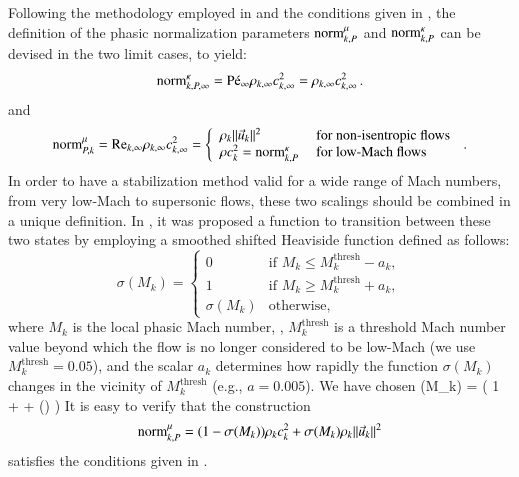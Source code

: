 \documentclass[preprint,10pt]{elsarticle}
\begin{document}
 
Following the methodology employed in \cite{DelchiniCompFluid2014-euler} and the conditions given in , the definition of the 
phasic normalization parameters $\textrm{norm}_{k,P}^\mu$ and $\textrm{norm}_{k,P}^\kappa$ can be devised in the two limit cases, to yield:
%
\begin{equation}
\label{eq:norm_relation_bis}
\textrm{norm}_{k,P,\infty}^{\kappa} = \textrm{P\'e}_\infty \rho_{k,\infty} c_{k,\infty}^2 = \rho_{k,\infty} c_{k,\infty}^2 \, .
\end{equation}
%
and
%
\begin{equation}
\label{eq:norm_ent2}
\textrm{norm}_{P,k}^\mu = \textrm{Re}_{k,\infty} \rho_{k,\infty} c_{k,\infty}^2 =  \left\{
\begin{array}{ll}
 \rho_k \|\vec{u}_k \|^2       & \text{ for non-isentropic flows} \\
 \rho c_k^2 = \textrm{norm}_{k,P}^\kappa & \text{ for low-Mach flows}
\end{array}
\right. \,.
\end{equation}
%
In order to have a stabilization method 
valid for a wide range of Mach numbers, from very low-Mach to supersonic flows, these two scalings should 
be combined in a unique definition. 
%
In \cite{DelchiniCompFluid2014-euler}, it was proposed a function to transition between these two states by employing a smoothed shifted Heaviside function
defined as follows: %
\begin{equation}
\sigma(M_k) =
\left\{
\begin{array}{ll}
0 & \text{if } M_k \le M_k^\text{thresh} - a_k, \\
1 & \text{if } M_k \ge M_k^\text{thresh} + a_k, \\
\sigma(M_k)   & \text{otherwise,}
\end{array}
\right.
\end{equation}
where $M_k$ is the local phasic Mach number, , $M_k^\text{thresh}$ is a threshold Mach number value beyond which the flow is no longer 
considered to be low-Mach (we use $M_k^\text{thresh}=0.05$), and the scalar $a_k$ determines how rapidly the function $\sigma(M_k)$ 
changes in the vicinity of $M_k^\text{thresh}$ (e.g., $a = 0.005$). We have chosen
\be
\sigma(M_k) =  \left( 1 +  +  \sin \left(\right) \right) 
\ee
It is easy to verify that the construction
\begin{equation}
\label{eq:norm_ent3}
\textrm{norm}_{k,P}^\mu = (1-\sigma(M_k)) \rho_k c_k^2  + \sigma(M_k)  \rho_k \|\vec{u}_k \|^2  
\end{equation}
satisfies the conditions given in .
%
\end{document}
